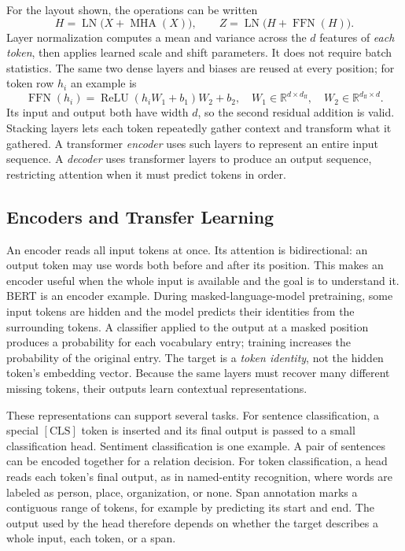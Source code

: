 \noindent
For the layout shown, the operations can be written
\begin{equation}
  H=\operatorname{LN}\bigl(X+\operatorname{MHA}(X)\bigr),\qquad
  Z=\operatorname{LN}\bigl(H+\operatorname{FFN}(H)\bigr).
  \label{eq:transformer-layer}
\end{equation}
\noindent
Layer normalization computes a mean and variance across the $d$ features of
\emph{each token}, then applies learned scale and shift parameters. It does not
require batch statistics. The same two dense layers and biases are reused at
every position; for token row $h_i$ an example is
\begin{equation}
  \operatorname{FFN}(h_i)=
  \operatorname{ReLU}(h_iW_1+b_1)W_2+b_2,
  \quad W_1\in\mathbb R^{d\times d_{\mathrm{ff}}},\quad
  W_2\in\mathbb R^{d_{\mathrm{ff}}\times d}.
  \label{eq:transformer-ffn}
\end{equation}
\noindent
Its input and output both have width $d$, so the second residual addition is
valid. Stacking layers lets each token repeatedly gather context and transform
what it gathered. A transformer \emph{encoder} uses such layers to represent
an entire input sequence. A \emph{decoder} uses transformer layers to produce
an output sequence, restricting attention when it must predict tokens in order.

\subsection{Encoders and Transfer Learning}

An encoder reads all input tokens at once. Its attention is bidirectional: an
output token may use words both before and after its position. This makes an
encoder useful when the whole input is available and the goal is to understand
it. BERT is an encoder example. During masked-language-model pretraining, some
input tokens are hidden and the model predicts their identities from the
surrounding tokens. A classifier applied to the output at a masked position
produces a probability for each vocabulary entry; training increases the
probability of the original entry. The target is a \emph{token identity}, not
the hidden token's embedding vector. Because the same layers must recover many
different missing tokens, their outputs learn contextual representations.

These representations can support several tasks. For sentence classification,
a special $[\mathrm{CLS}]$ token is inserted and its final output is passed to
a small classification head. Sentiment classification is one example. A pair
of sentences can be encoded together for a relation decision. For token
classification, a head reads each token's final output, as in named-entity
recognition, where words are labeled as person, place, organization, or none.
Span annotation marks a contiguous range of tokens, for example by predicting
its start and end. The output used by the head therefore depends on whether
the target describes a whole input, each token, or a span.

